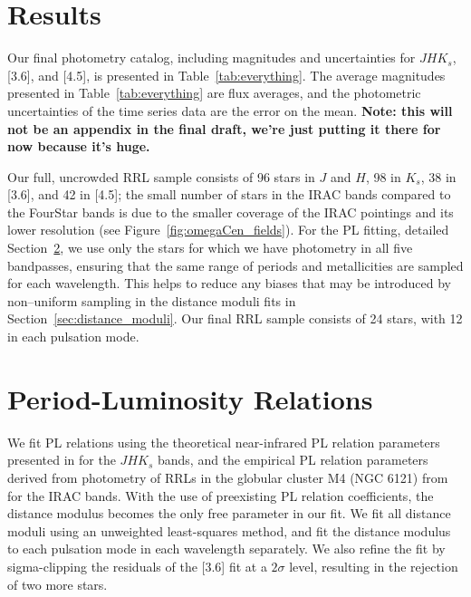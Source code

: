 \documentclass[a4paper,fleqn,usenatbib]{mnras}
\providecommand{\vscomment}[1]{{\textcolor{magenta}{{VS: #1}}}\xspace}
\begin{document}
\section{Results}
\label{sec:results}

Our final photometry catalog, including magnitudes and uncertainties for $J\!H\!K_s$, [3.6], and [4.5], is presented in Table~\ref{tab:everything}. The average magnitudes presented in Table~\ref{tab:everything} are flux averages, and the photometric uncertainties of the time series data are the error on the mean. 
{\bf Note: this will not be an appendix in the final draft, we're just putting it there for now because it's huge.}

Our full, uncrowded RRL sample consists of 96 stars in $J$ and $H$, 98 in $K_s$, 38 in [3.6], and 42 in [4.5]; the small number of stars in the IRAC bands compared to the FourStar bands is due to the smaller coverage of the IRAC pointings and its lower resolution (see Figure~\ref{fig:omegaCen_fields}). For the PL fitting, detailed Section~\ref{sec:pl_relation}, we use only the stars for which we have photometry in all five bandpasses, ensuring that the same range of periods and metallicities are sampled for each wavelength. This helps to reduce any biases that may be introduced by non--uniform sampling in the distance moduli fits in Section~\ref{sec:distance_moduli}. Our final RRL sample consists of 24 stars, with 12 in each pulsation mode.

\section{Period-Luminosity Relations}
\label{sec:pl_relation}

We fit PL relations using the theoretical near-infrared PL relation parameters presented in \citet{2015ApJ...808...50M} for the $JHK_s$ bands, and the empirical PL relation parameters derived from photometry of RRLs in the globular cluster M4 (NGC 6121) from \citet{2015ApJ...808...11N} for the IRAC bands. With the use of preexisting PL relation coefficients, the distance modulus becomes the only free parameter in our fit. We fit all distance moduli using an unweighted least-squares method, and fit the distance modulus to each pulsation mode in each wavelength separately. We also refine the fit by sigma-clipping the residuals of the [3.6] fit at a $2\sigma$ level, resulting in the rejection of two more stars.
\end{document}
